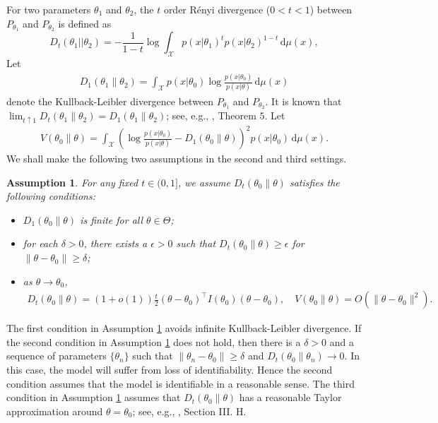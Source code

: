 \documentclass[11pt]{article}
\newcommand{\myT}{\intercal}
\theoremstyle{plain}
\newtheorem{assumption}{\quad\quad Assumption}
\theoremstyle{definition}
\theoremstyle{remark}
\begin{document}
 For two parameters $\theta_1$ and $\theta_2$, the $t$ order R\'{e}nyi divergence ($0<t <1$) between $P_{\theta_1}$ and $P_{\theta_2}$ is defined as
$$
D_{t}(\theta_1||\theta_2)=-\frac{1}{1-t}\log 
\int_{\mathcal{X}} p(x|\theta_1)^{t} p(x|\theta_2)^{1-t} \, \mathrm d \mu (x)
,
$$
Let 
\begin{align*}
    D_1(\theta_1 \| \theta_2) = \int_{\mathcal X} p( x |\theta_0) \log \frac{p(x | \theta_0)} { p( x | \theta) } \, \mathrm d \mu (x)
\end{align*}
denote the Kullback-Leibler divergence between $P_{\theta_1}$ and $P_{\theta_2}$.
It is known that $\lim_{t \uparrow 1} D_t(\theta_1 \| \theta_2) = D_1 (\theta_1 \| \theta_2)$; see, e.g., \cite{Erven2014}, Theorem $5$.
Let 
\begin{align*}
    V(\theta_0 \| \theta) = \int_{\mathcal X} \left( \log \frac{p(x|\theta_0)} { p(x | \theta) }  - D_1 (\theta_0 \| \theta) \right)^2  p( x |\theta_0) \, \mathrm d \mu (x).
\end{align*}
We shall make the following two assumptions in the second and third settings.
\begin{assumption}
    For any fixed $t \in (0,1]$,
    we assume $D_t\left( \theta_0 \| \theta \right)$ satisfies the following conditions:
    \begin{itemize}
        \item 
    $D_1(\theta_0 \| \theta)$ is finite for all $\theta \in \Theta$;
\item
    for each $\delta >0$,
    there exists a $\epsilon>0$ such that $D_t\left( \theta_0 \| \theta \right)\geq \epsilon$ for $\|\theta-\theta_0\| \geq \delta$;
\item
    as $\theta \to \theta_0$, 
    \begin{align*}
        D_t(\theta_0 \| \theta) = (1+o(1))\frac{t}{2} (\theta -\theta_0)^\myT I(\theta_0) (\theta - \theta_0),\quad
        V(\theta_0 \| \theta ) = O\left( \|\theta - \theta_0\|^2 \right)
        .
    \end{align*}
    \end{itemize}
    \label{assumption2019}
\end{assumption}
    The first condition in Assumption \ref{assumption2019} avoids infinite Kullback-Leibler divergence.
If the second condition in Assumption \ref{assumption2019} does not hold, then there is a $\delta>0$ and a sequence of parameters $\{\theta_n\}$ such that $\|\theta_n - \theta_0\| \geq \delta$ and $D_t(\theta_0 \| \theta_n ) \to 0  $.
In this case, the model will suffer from loss of identifiability.
Hence the second condition assumes that the model is identifiable in a reasonable sense.
The third condition in Assumption \ref{assumption2019} assumes that $D_t(\theta_0 \| \theta)$ has a reasonable Taylor approximation around $\theta =\theta_0$; see, e.g., \cite{Erven2014}, Section III. H.
\end{document}
